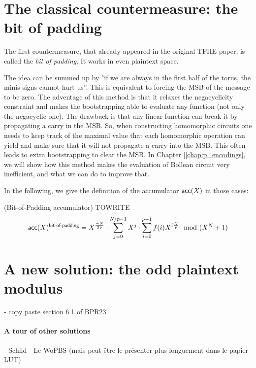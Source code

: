 \section{The classical countermeasure: the bit of padding}

The first countermeasure, that already appeared in the original TFHE paper, is called the \textit{bit of padding}. It works in even plaintext space.

The idea can be summed up by "if we are always in the first half of the torus, the minis signs cannot hurt us''. This is equivalent to forcing the MSB of the message to be zero. The adventage of this method is that it relaxes the negacyclicity constraint and makes the bootstrapping able to evaluate any function (not only the negacyclic one). The drawback is that any linear function can break it by propagating a carry in the MSB. So, when constructing homomorphic circuits one needs to keep track of the maximal value that each homomorphic operation can yield and make sure that it will not propagate a carry into the MSB. This often leads to extra bootstrapping to clear the MSB. In Chapter ]\ref{chap:p_encodings}, we will show how this method makes the evaluation of Bollean circuit very inefficient, and what we can do to improve that.


In the following, we give the definition of the accumulator $\textsf{acc}(X)$ in those cases:

\begin{definition}(Bit-of-Padding accumulator)
	TOWRITE
	\[
		\textsf{acc}(X)^{\textsf{bit-of-padding}} = X^{\frac{-N}{2p}} \cdot \sum_{j=0}^{N / p - 1} X^j \cdot \sum_{i=0}^{p - 1} f(i) X^{i \frac{N}{p}} \mod (X^N + 1)
	\]
\end{definition}







\section{A new solution: the odd plaintext modulus}

- copy paste section 6.1 of BPR23



\paragraph{A tour of other solutions}

- Schild
- Le WoPBS (mais peut-être le présenter plus longuement dans le papier LUT)






